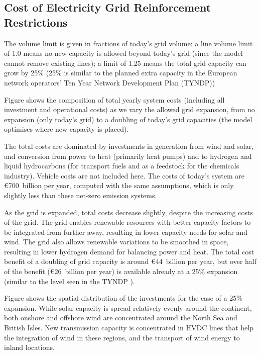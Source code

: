 \subsection{Cost of Electricity Grid Reinforcement Restrictions}
\label{sec:si:lv}

The volume limit is given in fractions of today's grid volume: a
line volume limit of 1.0 means no new capacity is allowed beyond today's grid
(since the model cannot remove existing lines); a limit of 1.25 means the total
grid capacity can grow by 25\% (25\% is similar to the planned extra capacity in
the European network operators' Ten Year Network Development Plan (TYNDP)\cite{TYNDP2016})

Figure shows the composition of total yearly system costs
(including all investment and operational costs) as we vary the allowed
grid expansion, from no expansion (only today's grid) to
a doubling of today's grid capacities (the model optimises where new
capacity is placed).

The total costs are dominated by investments in generation from wind
and solar, and conversion from power to heat (primarily heat pumps)
and to hydrogen and liquid hydrocarbons (for transport fuels and as a
feedstock for the chemicals industry). Vehicle costs are not included
here. The costs of today's system are \euro700~billion per year,
computed with the same assumptions, which is only slightly less than
these net-zero emission systems.

As the grid is expanded, total costs decrease
slightly, despite the increasing costs of the grid. The grid enables
renewable resources with better capacity factors to be integrated from
further away, resulting in lower capacity needs for solar and
wind. The grid also allows renewable variations to be smoothed in space,
resulting in lower hydrogen demand for balancing power and heat.  The
total cost benefit of a doubling of grid capacity is around
\euro44~billion per year, but over half of the benefit (\euro26~billion per year) is available already at a 25\% expansion (similar to the level seen in the TYNDP \cite{TYNDP2016}).

Figure shows the spatial distribution of the investments
for the case of a 25\% expansion. While solar capacity is spread
relatively evenly around the continent, both onshore and offshore wind
are concentrated around the North Sea and British Isles. New
transmission capacity is concentrated in HVDC lines that help the
integration of wind in these regions, and the transport of wind energy
to inland locations.

